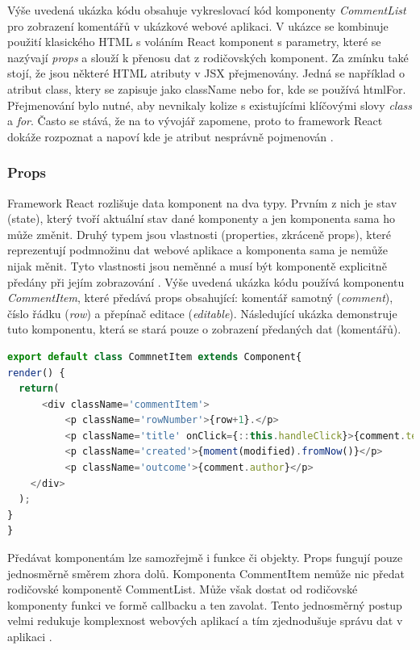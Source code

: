 Výše uvedená ukázka kódu obsahuje vykreslovací kód komponenty \textit{CommentList} pro zobrazení komentářů v ukázkové webové aplikaci. V ukázce se kombinuje použití klasického HTML s voláním React komponent s parametry, které se nazývají \textit{props} a slouží k přenosu dat z rodičovských komponent. Za zmínku také stojí, že jsou některé HTML atributy v JSX přejmenovány. Jedná se například o atribut class, ktery se zapisuje jako className nebo for, kde se používá htmlFor. Přejmenování bylo nutné, aby nevnikaly kolize s existujícími klíčovými slovy \textit{class} a \textit{for}. Často se stává, že na to vývojář zapomene, proto to framework React dokáže rozpoznat a napoví kde je atribut nesprávně pojmenován \cite{react} \cite{react_book}.

\subsubsection{Props}
\label{sec:react_props}
Framework React rozlišuje data komponent na dva typy. Prvním z nich je stav (state), který tvoří aktuální stav dané komponenty a jen komponenta sama ho může změnit. Druhý typem jsou vlastnosti (properties, zkráceně props), které reprezentují podmnožinu dat webové aplikace a komponenta sama je nemůže nijak měnit. Tyto vlastnosti jsou neměnné a musí být komponentě explicitně předány při jejím zobrazování \cite{react_components} \cite{react_thinking}. Výše uvedená ukázka kódu používá komponentu \textit{CommentItem}, které předává props obsahující: komentář samotný (\textit{comment}), číslo řádku (\textit{row}) a přepínač editace (\textit{editable}). Následující ukázka demonstruje tuto komponentu, která se stará pouze o zobrazení předaných dat (komentářů).

\begin{lstlisting}[language=Javascript,caption={Definice komponenty CommentItem, která zobrazuje komentář}]
export default class CommnetItem extends Component{
render() {
  return(
      <div className='commentItem'>
          <p className='rowNumber'>{row+1}.</p>
          <p className='title' onClick={::this.handleClick}>{comment.text}</p>
          <p className='created'>{moment(modified).fromNow()}</p>
          <p className='outcome'>{comment.author}</p>
    </div>
  );
}
}
\end{lstlisting}

Předávat komponentám lze samozřejmě i funkce či objekty. Props fungují pouze jednosměrně směrem zhora dolů. Komponenta CommentItem nemůže nic předat rodičovské komponentě CommentList. Může však dostat od rodičovské komponenty funkci ve formě callbacku a ten zavolat. Tento jednosměrný postup velmi redukuje komplexnost webových aplikací a tím zjednodušuje správu dat v aplikaci \cite{react} \cite{react_thinking}.

